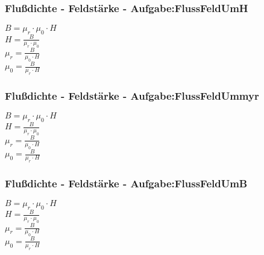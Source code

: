 \subsubsection{Flußdichte - Feldstärke - Aufgabe:FlussFeldUmH} 
\begin{minipage}{0.45\textwidth} 
$ B = \mu _{r} \cdot \mu _{0} \cdot H $\\ 
$ H =\frac{ B}{\mu _{r} \cdot \mu _{0} } $\\ 
$ \mu _{r} =\frac{ B}{\mu _{0} \cdot H} $\\ 
$ \mu _{0} =\frac{ B}{\mu _{r} \cdot H} $\\ 
\end{minipage} 
\begin{minipage}{0.45\textwidth} 
 
\end{minipage} 
\subsubsection{Flußdichte - Feldstärke - Aufgabe:FlussFeldUmmyr} 
\begin{minipage}{0.45\textwidth} 
$ B = \mu _{r} \cdot \mu _{0} \cdot H $\\ 
$ H =\frac{ B}{\mu _{r} \cdot \mu _{0} } $\\ 
$ \mu _{r} =\frac{ B}{\mu _{0} \cdot H} $\\ 
$ \mu _{0} =\frac{ B}{\mu _{r} \cdot H} $\\ 
\end{minipage} 
\begin{minipage}{0.45\textwidth} 
 
\end{minipage} 
\subsubsection{Flußdichte - Feldstärke - Aufgabe:FlussFeldUmB} 
\begin{minipage}{0.45\textwidth} 
$ B = \mu _{r} \cdot \mu _{0} \cdot H $\\ 
$ H =\frac{ B}{\mu _{r} \cdot \mu _{0} } $\\ 
$ \mu _{r} =\frac{ B}{\mu _{0} \cdot H} $\\ 
$ \mu _{0} =\frac{ B}{\mu _{r} \cdot H} $\\ 
\end{minipage} 
\begin{minipage}{0.45\textwidth} 
 
\end{minipage} 
